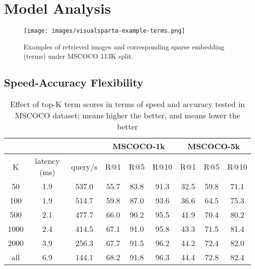 \documentclass[11pt,a4paper]{article}
\begin{document}
 

\section{Model Analysis}
\begin{figure*}[!ht]
\centering
\texttt{[image: images/visualsparta-example-terms.png]}
\caption{Examples of retrieved images and corresponding sparse embedding (terms) under MSCOCO 113K split.} 
\label{fig:visualsparta-example}
\end{figure*}

\subsection{Speed-Accuracy Flexibility}
\begin{table*}[!ht]
\centering
\begin{tabular}{ccccccccc}\hline \hline 
 & & & \multicolumn{3}{c}{MSCOCO-1k}&  \multicolumn{3}{c}{MSCOCO-5k} \\ \hline 

 K & latency (ms) & query/s & R@1 & R@5 & R@10 & R@1 & R@5 & R@10 \\ \hline  

50 & 1.9 & 537.0 & 55.7 & 83.8 & 91.3 & 32.5 & 59.8 & 71.1 \\
100	& 1.9 & 514.7	& 59.8 & 87.0 & 93.6 & 36.6 & 64.5 & 75.3 \\
500	& 2.1 & 477.7 & 66.0 & 90.2 & 95.5 & 41.9 & 70.4 & 80.2 \\
1000 & 2.4 & 414.5 & 67.1 & 91.0 & 95.8 & 43.3 & 71.5 & 81.4 \\
2000 & 3.9 & 256.3 & 67.7 & 91.5 & 96.2 & 44.2 & 72.4 & 82.0 \\
all & 6.9 & 144.1 & 68.2 & 91.8 & 96.3 & 44.4 & 72.8 & 82.4 \\ \hline

\end{tabular}
\caption{Effect of top-K term scores in terms of speed and accuracy tested in MSCOCO dataset;  means higher the better, and  means lower the better}
\label{tbl:visualsparta-tscore}
\end{table*}
\end{document}
